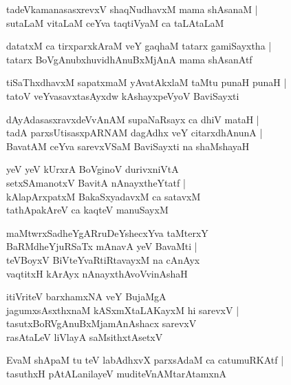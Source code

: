 \begin{shloka}
tadeVkamanasasxrevxV shaqNudhavxM mama shAsanaM |\\ sutaLaM vitaLaM ceYva taqtiVyaM ca taLAtaLaM
\end{shloka}

\begin{shloka}
datatxM ca tirxparxkAraM veY gaqhaM tatarx gamiSayxtha |\\
tatarx BoVgAnubxhuvidhAnuBxMjAnA mama shAsanAtf
\end{shloka}

\begin{shloka}
tiSaThxdhavxM sapatxmaM yAvatAkxlaM taMtu punaH punaH |\\ tatoV veYvasavxtasAyxdw kAshayxpeVyoV BaviSayxti
\end{shloka}

\begin{shloka}
dAyAdasasxravxdeVvAnAM supaNaRsayx ca dhiV mataH |\\ tadA parxsUtisasxpARNAM dagAdhx veY citarxdhAnunA |\\ BavatAM ceYva sarevxVSaM BaviSayxti na shaMshayaH
\end{shloka}

\begin{shloka}
yeV yeV kUrxrA BoVginoV durivxniVtA \\ setxSAmanotxV BavitA nAnayxtheYtatf |\\ kAlapArxpatxM BakaSxyadavxM ca satavxM\\ tathApakAreV ca kaqteV manuSayxM
\end{shloka}

\begin{shloka}
maMtwrxSadheYgARruDeYshecxYva taMterxY\\ BaRMdheYjuRSaTx mAnavA yeV BavaMti |\\ teVBoyxV BiVteYvaRtiRtavayxM na cAnAyx\\ vaqtitxH kArAyx nAnayxthAvoVvinAshaH
\end{shloka}

\begin{shloka}
itiVriteV barxhamxNA veY BujaMgA\\ jagumxsAsxthxnaM kASxmXtaLAKayxM hi sarevxV |\\tasutxBoRVgAnuBxMjamAnAshacx sarevxV\\ rasAtaLeV liVlayA saMsithxtAsetxV
\end{shloka}

\begin{shloka}
EvaM shApaM tu teV labAdhxvX parxsAdaM ca catumuRKAtf |\\ tasuthxH pAtALanilayeV muditeVnAMtarAtamxnA
\end{shloka}

